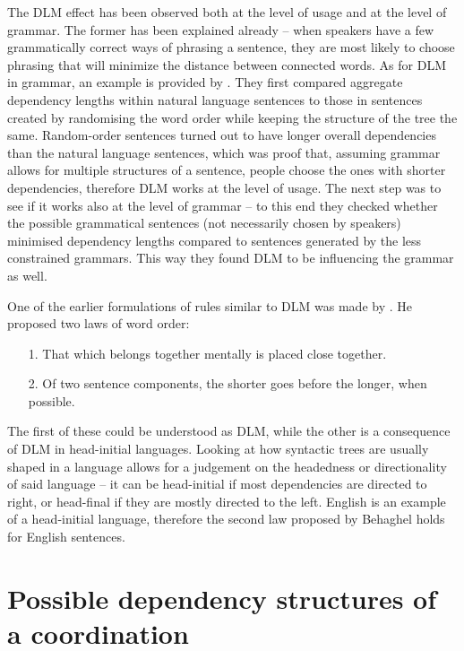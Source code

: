 The DLM effect has been observed both at the level of usage and at the level of grammar. The former has been explained already -- when speakers have a few grammatically correct ways of phrasing a sentence, they are most likely to choose phrasing that will minimize the distance between connected words. As for DLM in grammar, an example is provided by \cite{futrell2020}. They first compared aggregate dependency lengths within natural language sentences to those in sentences created by randomising the word order while keeping the structure of the tree the same. Random-order sentences turned out to have longer overall dependencies than the natural language sentences, which was proof that, assuming grammar allows for multiple structures of a sentence, people choose the ones with shorter dependencies, therefore DLM works at the level of usage. The next step was to see if it works also at the level of grammar -- to this end they checked whether the possible grammatical sentences (not necessarily chosen by speakers) minimised dependency lengths compared to sentences generated by the less constrained grammars. This way they found DLM to be influencing the grammar as well.

One of the earlier formulations of rules similar to DLM was made by \cite{behaghel}. He proposed two laws of word order:

\begin{itemize}
    \item[1.] That which belongs together mentally is placed close together.
    \item[2.] Of two sentence components, the shorter goes before the longer, when possible.
\end{itemize}

The first of these could be understood as DLM, while the other is a consequence of DLM in head-initial languages. Looking at how syntactic trees are usually shaped in a language allows for a judgement on the headedness or directionality of said language -- it can be head-initial if most dependencies are directed to right, or head-final if they are mostly directed to the left. English is an example of a head-initial language, therefore the second law proposed by Behaghel holds for English sentences. 

\section{Possible dependency structures of a coordination}\label{sec:coord annotations}

